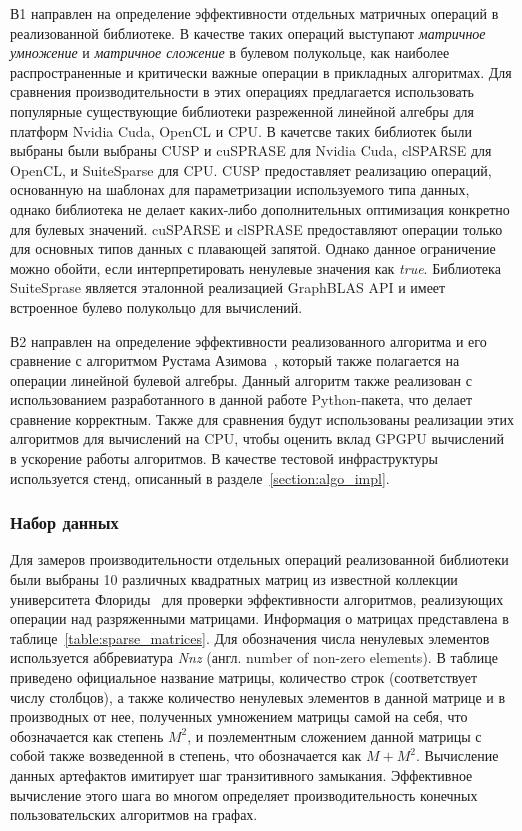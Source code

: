 В1 направлен на определение эффективности отдельных матричных операций в реализованной библиотеке. В качестве таких операций выступают \textit{матричное умножение} и \textit{матричное сложение} в булевом полукольце, как наиболее распространенные и критически важные операции в прикладных алгоритмах. Для сравнения производительности в этих операциях предлагается использовать популярные существующие библиотеки разреженной линейной алгебры для платформ Nvidia Cuda, OpenCL и CPU. В качетсве таких библиотек были выбраны были выбраны CUSP и cuSPRASE для Nvidia Cuda, clSPARSE для OpenCL, и SuiteSparse для CPU. CUSP предоставляет реализацию операций, основанную на шаблонах для параметризации используемого типа данных, однако библиотека не делает каких-либо дополнительных оптимизация конкретно для булевых значений. cuSPARSE и clSPRASE предоставляют операции только для основных типов данных с плавающей запятой. Однако данное ограничение можно обойти, если интерпретировать ненулевые значения как \textit{true}. Библиотека SuiteSprase является эталонной реализацией GraphBLAS API и имеет встроенное булево полукольцо для вычислений.

В2 направлен на определение эффективности реализованного алгоритма и его сравнение с алгоритмом Рустама Азимова~\cite{inproceedings:cfqp_matrix_with_single_source}, который также полагается на операции линейной булевой алгебры. Данный алгоритм также реализован с использованием разработанного в данной работе Python-пакета, что делает сравнение корректным. Также для сравнения будут использованы реализации этих алгоритмов для вычислений на CPU, чтобы оценить вклад GPGPU вычислений в ускорение работы алгоритмов. В качестве тестовой инфраструктуры используется стенд, описанный в разделе~\ref{section:algo_impl}.

\subsubsection*{Набор данных}

Для замеров производительности отдельных операций реализованной библиотеки были выбраны 10 различных квадратных матриц из известной коллекции университета Флориды~\cite{net:sp_matrix_data_florida} для проверки эффективности алгоритмов, реализующих операции над разряженными матрицами. 
Информация о матрицах представлена в таблице~\ref{table:sparse_matrices}. 
Для обозначения числа ненулевых элементов используется аббревиатура \textit{Nnz} (англ. number of non-zero elements). 
В таблице приведено официальное название матрицы, количество строк (соответствует числу столбцов), а также количество ненулевых элементов в данной матрице и в производных от нее, полученных умножением матрицы самой на себя, что обозначается как степень $M^2$, и поэлементным сложением данной матрицы с собой также возведенной в степень, что обозначается как $M + M^2$.
Вычисление данных артефактов имитирует шаг транзитивного замыкания.
Эффективное вычисление этого шага во многом определяет производительность конечных пользовательских алгоритмов на графах.

